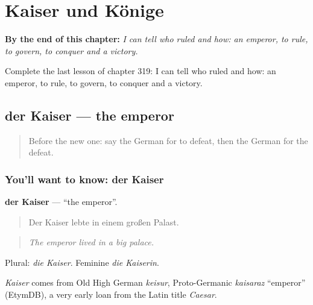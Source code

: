 
\chapter{Kaiser und Könige}
\label{ch:ge-kaiser-und-konige}

\begin{chapteropening}
\textbf{By the end of this chapter:} \emph{I can tell who ruled and how: an emperor, to rule, to govern, to conquer and a victory.}

Complete the last lesson of chapter 319: I can tell who ruled and how: an emperor, to rule, to govern, to conquer and a victory.
\end{chapteropening}

\section[der Kaiser]{der Kaiser — the emperor}

\label{lesson:GE-C319-kaiser}



\begin{quote}
Before the new one: say the German for to defeat, then the German for the defeat.
\end{quote}

\subsection*{You'll want to know: der Kaiser}
\textbf{der Kaiser} — \textquotedblleft{}the emperor\textquotedblright{}.

\begin{quote}
Der Kaiser lebte in einem großen Palast.
\end{quote}

\begin{quote}
\emph{The emperor lived in a big palace.}
\end{quote}

Plural: \emph{die Kaiser}. Feminine \emph{die Kaiserin}.

\begin{cousinweb}
\emph{Kaiser} comes from Old High German \emph{keisur}, Proto-Germanic \emph{kaisaraz} \textquotedblleft{}emperor\textquotedblright{} (EtymDB), a very early loan from the Latin title \emph{Caesar}.
\end{cousinweb}

